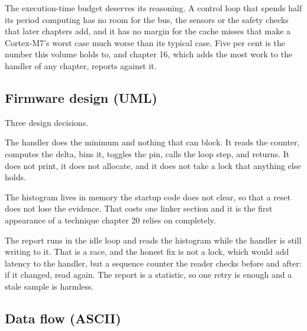 The execution-time budget deserves its reasoning. A control loop that spends
half its period computing has no room for the bus, the sensors or the safety
checks that later chapters add, and it has no margin for the cache misses that
make a Cortex-M7's worst case much worse than its typical case. Five per cent is
the number this volume holds to, and chapter 16, which adds the most work to the
handler of any chapter, reports against it.

\subsection*{Firmware design (UML)}


Three design decisions.

The handler does the minimum and nothing that can block. It reads the counter,
computes the delta, bins it, toggles the pin, calls the loop step, and returns.
It does not print, it does not allocate, and it does not take a lock that
anything else holds.

The histogram lives in memory the startup code does not clear, so that a reset
does not lose the evidence. That costs one linker section and it is the first
appearance of a technique chapter 20 relies on completely.

The report runs in the idle loop and reads the histogram while the handler is
still writing to it. That is a race, and the honest fix is not a lock, which
would add latency to the handler, but a sequence counter the reader checks
before and after: if it changed, read again. The report is a statistic, so one
retry is enough and a stale sample is harmless.

\subsection*{Data flow (ASCII)}

